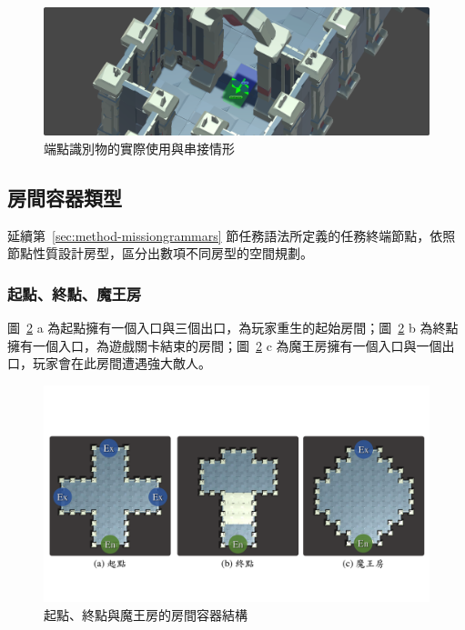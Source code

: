 \begin{figure}[!htb]
  \begin{center}
    \includegraphics[width=1.0\textwidth]{figures/connections-in-volume.png}
    \caption{端點識別物的實際使用與串接情形} 
    \label{fig:connections-in-volume}
  \end{center}
\end{figure}

\subsection{房間容器類型}
\label{ssec:method-spacepieces-types}

延續第~\ref{sec:method-missiongrammars} 節任務語法所定義的任務終端節點，依照節點性質設計房型，區分出數項不同房型的空間規劃。

\subsubsection{起點、終點、魔王房}
\label{sssec:method-spacepieces-types-mainpath-i}

圖~\ref{fig:roomtype-mainpath-i} a 為起點擁有一個入口與三個出口，為玩家重生的起始房間；圖~\ref{fig:roomtype-mainpath-i} b 為終點擁有一個入口，為遊戲關卡結束的房間；圖~\ref{fig:roomtype-mainpath-i} c 為魔王房擁有一個入口與一個出口，玩家會在此房間遭遇強大敵人。

\begin{figure}[!htb]
  \begin{center}
    \includegraphics[width=1.0\textwidth]{figures/roomtype-mainpath-i.pdf}
    \caption{起點、終點與魔王房的房間容器結構}
    \label{fig:roomtype-mainpath-i}
  \end{center}
\end{figure}

